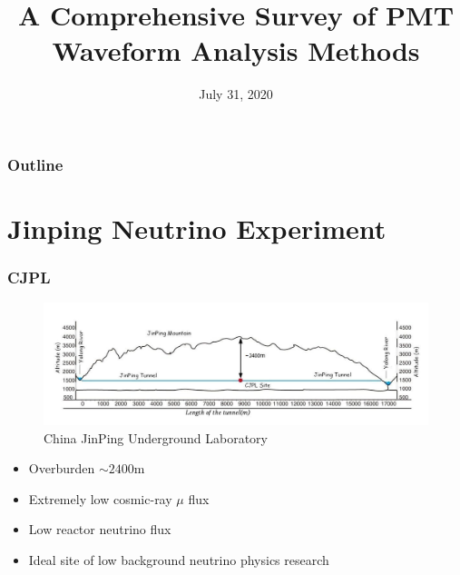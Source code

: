 \documentclass{beamer}
\title[Waveform Analysis]{A Comprehensive Survey of PMT Waveform Analysis Methods}
\date[DANCE]{July 31, 2020}
\begin{document}
\frame{\titlepage}

\begin{frame}
\frametitle{Outline}
\tableofcontents
\end{frame}

\section{Jinping Neutrino Experiment}
\begin{frame}
\frametitle{CJPL}
\begin{figure}
    \centering
    \caption{China JinPing Underground Laboratory}
    \includegraphics[width=1.0\linewidth]{img/mountain.png}
\end{figure}
\begin{itemize}
    \item Overburden $\sim2400\mathrm{m}$
    \item Extremely low cosmic-ray $\mu$ flux
    \item Low reactor neutrino flux
    \item Ideal site of low background neutrino physics research
\end{itemize}
\end{frame}
\end{document}
